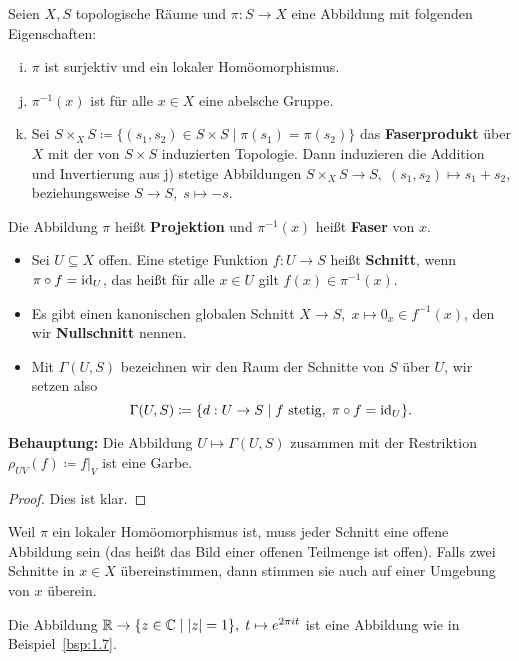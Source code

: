 \begin{bsp}
\label{bsp:1.7}
	Seien $X,S$ topologische Räume und $\pi:S\to X$ eine Abbildung mit folgenden Eigenschaften:
	\begin{enumerate}[a)]
		\setcounter{enumi}{8}
		\item $\pi$ ist surjektiv und ein lokaler Homöomorphismus.
		\item $\pi^{-1}(x)$ ist für alle $x\in X$ eine abelsche Gruppe.
		\item Sei $S\times_X S\coloneqq \{(s_1,s_2) \in S \times S \mid \pi(s_1)=\pi(s_2)\}$ das \textbf{Faserprodukt} über $X$ mit der von $S \times S$ induzierten Topologie. Dann induzieren die Addition und Invertierung aus j) stetige Abbildungen $S\times_X S \to S,\; (s_1,s_2) \mapsto s_1+s_2$, beziehungsweise $S \to S,\; s \mapsto -s$.
	\end{enumerate}
	Die Abbildung $\pi$ heißt \textbf{Projektion} und $\pi^{-1}(x)$ heißt \textbf{Faser} von $x$.
	\begin{itemize}
		\item Sei $U \subseteq X$ offen. Eine stetige Funktion $f:U \to S$ heißt \textbf{Schnitt}, wenn $\pi \circ f = \operatorname{id}_U$, das heißt für alle $x \in U$ gilt $f(x) \in \pi^{-1}(x)$.
		\item Es gibt einen kanonischen globalen Schnitt $X \to S, \; x \mapsto 0_x \in f^{-1}(x)$, den wir \textbf{Nullschnitt} nennen.
		\item Mit $\Gamma(U,S)$ bezeichnen wir den Raum der Schnitte von $S$ über $U$, wir setzen also
		\[
			\Gamma(U,S) \coloneqq \{d:U\to S \mid f \text{ stetig},\; \pi\circ f = \operatorname{id}_U\}.
		\]
	\end{itemize}
	\textbf{Behauptung:} Die Abbildung $U \mapsto \Gamma(U,S)$ zusammen mit der Restriktion $\rho_{UV}(f) \coloneqq f\vert_V$ ist eine Garbe.
	\begin{proof}
		Dies ist klar.
	\end{proof}
\end{bsp}

\begin{bem}
	Weil $\pi$ ein lokaler Homöomorphismus ist, muss jeder Schnitt eine offene Abbildung sein (das heißt das Bild einer offenen Teilmenge ist offen). Falls zwei Schnitte in $x \in X$ übereinstimmen, dann stimmen sie auch auf einer Umgebung von $x$ überein.
\end{bem}

\begin{bsp*}
	Die Abbildung $\mathbb {R} \to \{z\in \mathbb {C} \mid \left \lvert z \right \rvert = 1\},\; t \mapsto e^{2 \pi i t}$ ist eine Abbildung wie in Beispiel~\ref{bsp:1.7}.
\end{bsp*}


